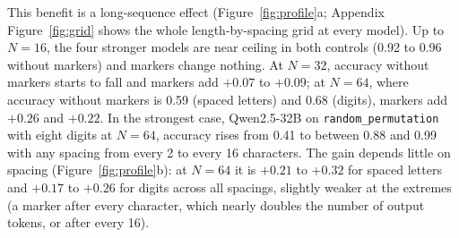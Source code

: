 \documentclass[10pt]{article} %
\newcommand{\task}[1]{\texttt{#1}}
\begin{document}
This benefit is a long-sequence effect (Figure~\ref{fig:profile}a; Appendix Figure~\ref{fig:grid} shows the whole length-by-spacing grid at every model). Up to $N = 16$, the four stronger models are near ceiling in both controls (0.92 to 0.96 without markers) and markers change nothing. At $N = 32$, accuracy without markers starts to fall and markers add $+0.07$ to $+0.09$; at $N = 64$, where accuracy without markers is 0.59 (spaced letters) and 0.68 (digits), markers add $+0.26$ and $+0.22$. In the strongest case, Qwen2.5-32B on \task{random\_permutation} with eight digits at $N = 64$, accuracy rises from 0.41 to between 0.88 and 0.99 with any spacing from every 2 to every 16 characters. The gain depends little on spacing (Figure~\ref{fig:profile}b): at $N = 64$ it is $+0.21$ to $+0.32$ for spaced letters and $+0.17$ to $+0.26$ for digits across all spacings, slightly weaker at the extremes (a marker after every character, which nearly doubles the number of output tokens, or after every 16).
\end{document}
